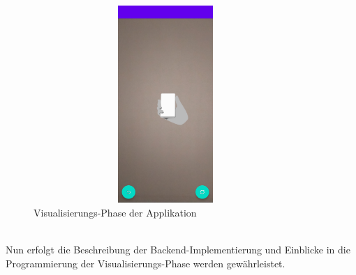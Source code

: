 \begin{figure}[hbt!]
    \centering
    \includegraphics[width=10cm,height=7.5cm,keepaspectratio]{4Umsetzung/Bilder/visual-phase.jpg}
    \caption{Visualisierungs-Phase der Applikation}
    \label{pic:visual}
\end{figure} 
\\
Nun erfolgt die Beschreibung der Backend-Implementierung und Einblicke in die Programmierung der Visualisierungs-Phase werden gewährleistet. 
